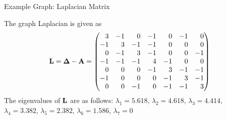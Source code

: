 \begin{frame}{Example Graph: Laplacian Matrix}
\begin{figure}
    \centerline{
	}
		\vspace{-0.2in}
 \end{figure}
\small
 The graph Laplacian is given as
    \begin{align*}
        \bL = \bDelta-\bA =
        \amatr{r}{
                 3 &  -1 &   0 &  -1 &   0 &  -1 &   0\\
                -1 &   3 &  -1 &  -1 &   0 &   0 &   0\\
                 0 &  -1 &   3 &  -1 &   0 &   0 &  -1\\
                -1 &  -1 &  -1 &   4 &  -1 &   0 &   0\\
                 0 &   0 &   0 &  -1 &   3 &  -1 &  -1\\
                -1 &   0 &   0 &   0 &  -1 &   3 &  -1\\
                 0 &   0 &  -1 &   0 &  -1 &  -1 &   3}
    \end{align*}
    The eigenvalues of $\mathbf{L}$ are as follows:
    $\lambda_1= 5.618$,
    $\lambda_2=4.618$,
    $\lambda_3= 4.414 $,
    $\lambda_4=3.382$,
    $\lambda_5=2.382 $,
    $\lambda_6=1.586 $,
    $\lambda_7= 0$  
\end{frame}


